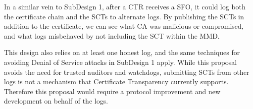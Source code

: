 In a similar vein to SubDesign 1, after a CTR receives a SFO, it could log both the
certificate chain and the SCTs to alternate logs.  By publishing the SCTs in addition
to the certificate, we can see what CA was malicious or compromised, and what logs
misbehaved by not including the SCT within the MMD.

This design also relies on at least one honest log, and the same techniques for avoiding
Denial of Service attacks in SubDesign 1 apply. While this proposal avoids the need for
trusted auditors and watchdogs, submitting SCTs from other logs is not a mechanism
that Certificate Transparency currently supports. Therefore this proposal would require
a protocol improvement and new development on behalf of the logs.
